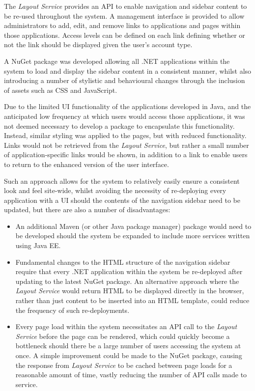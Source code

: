 The \textit{Layout Service} provides an API to enable navigation and sidebar content to be re-used throughout the system. A management interface is provided to allow administrators to add, edit, and remove links to applications and pages within those applications. Access levels can be defined on each link defining whether or not the link should be displayed given the user's account type.

A NuGet package was developed allowing all .NET applications within the system to load and display the sidebar content in a consistent manner, whilst also introducing a number of stylistic and behavioural changes through the inclusion of assets such as CSS and JavaScript.

Due to the limited UI functionality of the applications developed in Java, and the anticipated low frequency at which users would access those applications, it was not deemed necessary to develop a package to encapsulate this functionality. Instead, similar styling was applied to the pages, but with reduced functionality. Links would not be retrieved from the \textit{Layout Service}, but rather a small number of application-specific links would be shown, in addition to a link to enable users to return to the enhanced version of the user interface.

Such an approach allows for the system to relatively easily ensure a consistent look and feel site-wide, whilst avoiding the necessity of re-deploying every application with a UI should the contents of the navigation sidebar need to be updated, but there are also a number of disadvantages:
\begin{itemize}
    \item An additional Maven (or other Java package manager) package would need to be developed should the system be expanded to include more services written using Java EE.
    \item Fundamental changes to the HTML structure of the navigation sidebar require that every .NET application within the system be re-deployed after updating to the latest NuGet package. An alternative approach where the \textit{Layout Service} would return HTML to be displayed directly in the browser, rather than just content to be inserted into an HTML template, could reduce the frequency of such re-deployments.
    \item Every page load within the system necessitates an API call to the \textit{Layout Service} before the page can be rendered, which could quickly become a bottleneck should there be a large number of users accessing the system at once. A simple improvement could be made to the NuGet package, causing the response from \textit{Layout Service} to be cached between page loads for a reasonable amount of time, vastly reducing the number of API calls made to service.
\end{itemize}
